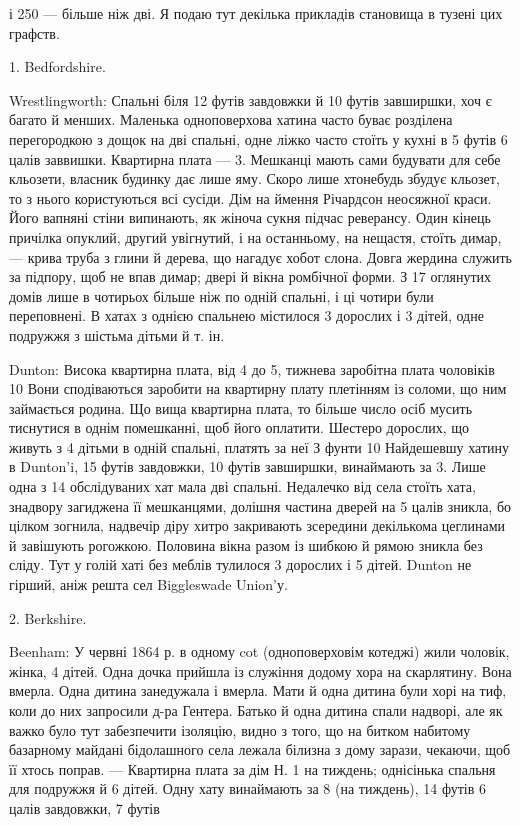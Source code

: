 \parcont{}  %
і 250 — більше ніж дві. Я подаю тут декілька прикладів становища
в тузені цих графств.

1. Bedfordshire.

Wrestlingworth: Спальні біля 12 футів завдовжки й 10 футів
завширшки, хоч є багато й менших. Маленька одноповерхова
хатина часто буває розділена перегородкою з дощок на дві
спальні, одне ліжко часто стоїть у кухні в 5 футів 6 цалів заввишки.
Квартирна плата — 3. Мешканці мають
сами будувати для себе кльозети, власник будинку дає лише
яму. Скоро лише хтонебудь збудує кльозет, то з нього користуються
всі сусіди. Дім на ймення Річардсон неосяжної краси.
Його вапняні стіни випинають, як жіноча сукня підчас реверансу.
Один кінець причілка опуклий, другий увігнутий, і на
останньому, на нещастя, стоїть димар, — крива труба з глини
й дерева, що нагадує хобот слона. Довга жердина служить за
підпору, щоб не впав димар; двері й вікна ромбічної форми.
З 17 оглянутих домів лише в чотирьох більше ніж по одній
спальні, і ці чотири були переповнені. В хатах з однією спальнею
містилося 3 дорослих і 3 дітей, одне подружжя з шістьма
дітьми й т. ін.

Dunton: Висока квартирна плата, від 4 до 5,
тижнева заробітна плата чоловіків 10 Вони сподіваються
заробити на квартирну плату плетінням із соломи, що ним займається
родина. Що вища квартирна плата, то більше число осіб
мусить тиснутися в однім помешканні, щоб його оплатити. Шестеро
дорослих, що живуть з 4 дітьми в одній спальні, платять за неї
З фунти 10 Найдешевшу хатину в Dunton’i, 15 футів
завдовжки, 10 футів завширшки, винаймають за 3.
Лише одна з 14 обслідуваних хат мала дві спальні. Недалечко
від села стоїть хата, знадвору загиджена її мешканцями, долішня
частина дверей на 5 цалів зникла, бо цілком зогнила, надвечір
діру хитро закривають зсередини декількома цеглинами й завішують
рогожкою. Половина вікна разом із шибкою й рямою
зникла без сліду. Тут у голій хаті без меблів тулилося 3 дорослих
і 5 дітей. Dunton не гірший, аніж решта сел Biggleswade Union’у.

2. Berkshire.

Beenham: У червні 1864 р. в одному cot (одноповерховім
котеджі) жили чоловік, жінка, 4 дітей. Одна дочка прийшла із
служіння додому хора на скарлятину. Вона вмерла. Одна дитина
занедужала і вмерла. Мати й одна дитина були хорі на тиф, коли
до них запросили д-ра Гентера. Батько й одна дитина спали
надворі, але як важко було тут забезпечити ізоляцію, видно з
того, що на битком набитому базарному майдані бідолашного
села лежала білизна з дому зарази, чекаючи, щоб її хтось поправ.
— Квартирна плата за дім Н. 1 на тиждень; однісінька
спальня для подружжя й 6 дітей. Одну хату винаймають
за 8 (на тиждень), 14 футів 6 цалів завдовжки, 7 футів
\parbreak{}  %
